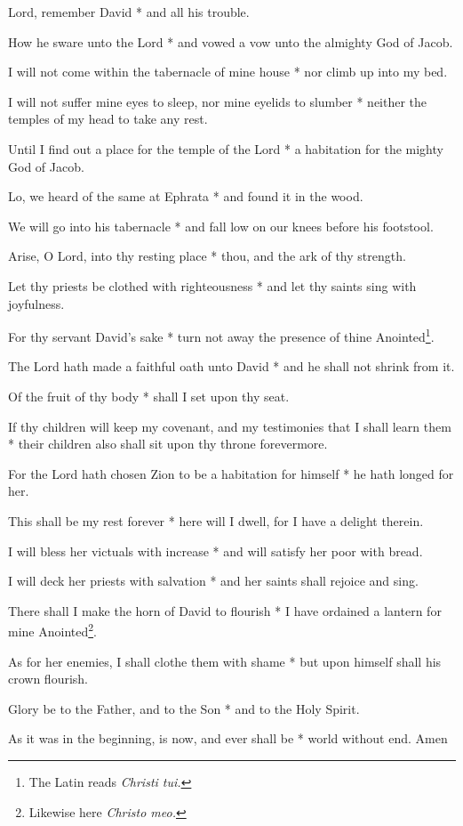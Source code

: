 Lord, remember David * and all his trouble.

How he sware unto the Lord * and vowed a vow unto the almighty God of Jacob.

I will not come within the tabernacle of mine house * nor climb up into my bed.

I will not suffer mine eyes to sleep, nor mine eyelids to slumber * neither the temples of my head to take any rest.

Until I find out a place for the temple of the Lord * a habitation for the mighty God of Jacob.

Lo, we heard of the same at Ephrata * and found it in the wood.

We will go into his tabernacle * and fall low on our knees before his footstool.

Arise, O Lord, into thy resting place * thou, and the ark of thy strength.

Let thy priests be clothed with righteousness * and let thy saints sing with joyfulness.

For thy servant David's sake * turn not away the presence of thine Anointed\footnote{The Latin reads \textit{Christi tui.}}.

The Lord hath made a faithful oath unto David * and he shall not shrink from it.

Of the fruit of thy body * shall I set upon thy seat.

If thy children will keep my covenant, and my testimonies that I shall learn them * their children also shall sit upon thy throne forevermore.

For the Lord hath chosen Zion to be a habitation for himself * he hath longed for her.

This shall be my rest forever * here will I dwell, for I have a delight therein.

I will bless her victuals with increase * and will satisfy her poor with bread.

I will deck her priests with salvation * and her saints shall rejoice and sing.

There shall I make the horn of David to flourish * I have ordained a lantern for mine Anointed\footnote{Likewise here \textit{Christo meo.}}.

As for her enemies, I shall clothe them with shame * but upon himself shall his crown flourish.

Glory be to the Father, and to the Son * and to the Holy Spirit.

As it was in the beginning, is now, and ever shall be * world without end. Amen
